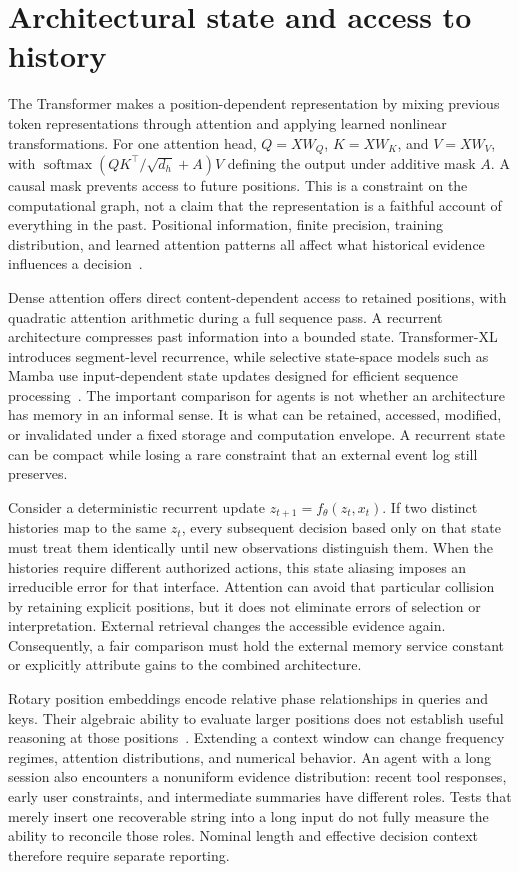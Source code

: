 \section{Architectural state and access to history}
\label{sec:C03:architectures}
The Transformer makes a position-dependent representation by mixing previous token representations through attention and applying learned nonlinear transformations. For one attention head, $Q=XW_Q$, $K=XW_K$, and $V=XW_V$, with $\operatorname{softmax}(QK^\top/\sqrt{d_h}+A)V$ defining the output under additive mask $A$. A causal mask prevents access to future positions. This is a constraint on the computational graph, not a claim that the representation is a faithful account of everything in the past. Positional information, finite precision, training distribution, and learned attention patterns all affect what historical evidence influences a decision~\cite{vaswani2017attention}.

Dense attention offers direct content-dependent access to retained positions, with quadratic attention arithmetic during a full sequence pass. A recurrent architecture compresses past information into a bounded state. Transformer-XL introduces segment-level recurrence, while selective state-space models such as Mamba use input-dependent state updates designed for efficient sequence processing~\cite{dai2019transformerxl,gu2023mamba}. The important comparison for agents is not whether an architecture has memory in an informal sense. It is what can be retained, accessed, modified, or invalidated under a fixed storage and computation envelope. A recurrent state can be compact while losing a rare constraint that an external event log still preserves.

Consider a deterministic recurrent update $z_{t+1}=f_\theta(z_t,x_t)$. If two distinct histories map to the same $z_t$, every subsequent decision based only on that state must treat them identically until new observations distinguish them. When the histories require different authorized actions, this state aliasing imposes an irreducible error for that interface. Attention can avoid that particular collision by retaining explicit positions, but it does not eliminate errors of selection or interpretation. External retrieval changes the accessible evidence again. Consequently, a fair comparison must hold the external memory service constant or explicitly attribute gains to the combined architecture.

Rotary position embeddings encode relative phase relationships in queries and keys. Their algebraic ability to evaluate larger positions does not establish useful reasoning at those positions~\cite{su2021roformer}. Extending a context window can change frequency regimes, attention distributions, and numerical behavior. An agent with a long session also encounters a nonuniform evidence distribution: recent tool responses, early user constraints, and intermediate summaries have different roles. Tests that merely insert one recoverable string into a long input do not fully measure the ability to reconcile those roles. Nominal length and effective decision context therefore require separate reporting.

